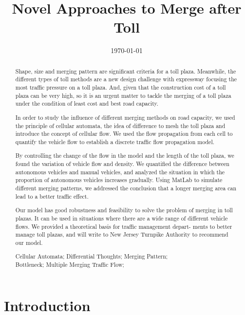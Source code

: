 \documentclass{mcmthesis}
\title{Novel Approaches to Merge after Toll}
\date{\today}
\begin{document}
\begin{abstract}
	Shape, size and merging pattern are significant criteria for a toll plaza. Meanwhile, the different types of  toll methods are a new design challenge with expressway  focusing the most traffic pressure on a toll plaza. And, given that the construction cost of a toll plaza can be very high, so it is an urgent matter to tackle the merging of a toll plaza under the condition of  least cost and best road capacity.
	
	In order to study the influence of different merging methods on road capacity, we used the principle of cellular automata, the idea of difference to mesh the toll plaza and introduce the concept of cellular flow. We used the flow propagation from each cell to quantify the vehicle flow to establish a discrete traffic flow propagation model.
	
	By controlling the change of the flow in the model and the length of the toll plaza, we found the variation of vehicle flow and density. We quantified the difference between autonomous vehicles and manual vehicles, and analyzed the situation in which the proportion of autonomous vehicles increases gradually. Using MatLab to simulate different merging patterns, we addressed the conclusion that a longer merging area can lead to a better traffic effect.
	
	Our model has good robustness and feasibility to solve the problem of merging in toll plazas. It can be used in situations where there are a wide range of  different vehicle flows. We provided a theoretical basis for traffic management depart- ments to better manage toll plazas, and will write to New Jersey Turnpike Authority to recommend our model.
	\begin{keywords}
		Cellular Automata; Differential Thoughts; Merging Pattern;\\ \phantom \qquad \qquad \qquad \qquad  Bottleneck; Multiple Merging Traffic Flow;
	\end{keywords}
\end{abstract}
\maketitle
\tableofcontents
\newpage
\section{Introduction}

\end{document}
